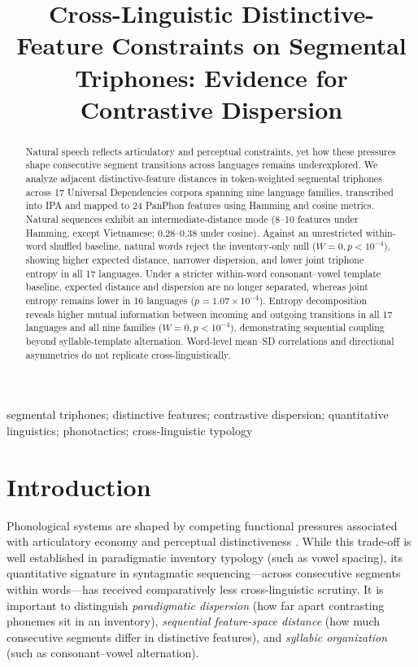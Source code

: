 \documentclass{interact}
\begin{document}

\title{Cross-Linguistic Distinctive-Feature Constraints on Segmental Triphones: Evidence for Contrastive Dispersion}

\author{
}

\maketitle

\begin{abstract}
Natural speech reflects articulatory and perceptual constraints, yet how these pressures shape consecutive segment transitions across languages remains underexplored. We analyze adjacent distinctive-feature distances in token-weighted segmental triphones across 17 Universal Dependencies corpora spanning nine language families, transcribed into IPA and mapped to 24 PanPhon features using Hamming and cosine metrics. Natural sequences exhibit an intermediate-distance mode (8--10 features under Hamming, except Vietnamese; 0.28--0.38 under cosine). Against an unrestricted within-word shuffled baseline, natural words reject the inventory-only null ($W=0, p < 10^{-4}$), showing higher expected distance, narrower dispersion, and lower joint triphone entropy in all 17 languages. Under a stricter within-word consonant--vowel template baseline, expected distance and dispersion are no longer separated, whereas joint entropy remains lower in 16 languages ($p = 1.07 \times 10^{-4}$). Entropy decomposition reveals higher mutual information between incoming and outgoing transitions in all 17 languages and all nine families ($W=0, p < 10^{-4}$), demonstrating sequential coupling beyond syllable-template alternation. Word-level mean--SD correlations and directional asymmetries do not replicate cross-linguistically.
\end{abstract}

\begin{keywords}
segmental triphones; distinctive features; contrastive dispersion; quantitative linguistics; phonotactics; cross-linguistic typology
\end{keywords}

\section{Introduction}
Phonological systems are shaped by competing functional pressures associated with articulatory economy and perceptual distinctiveness \citep{zipf1949,lindblom1990,flemming2004}. While this trade-off is well established in paradigmatic inventory typology (such as vowel spacing), its quantitative signature in syntagmatic sequencing---across consecutive segments within words---has received comparatively less cross-linguistic scrutiny. It is important to distinguish \emph{paradigmatic dispersion} (how far apart contrasting phonemes sit in an inventory), \emph{sequential feature-space distance} (how much consecutive segments differ in distinctive features), and \emph{syllabic organization} (such as consonant--vowel alternation).
\end{document}
